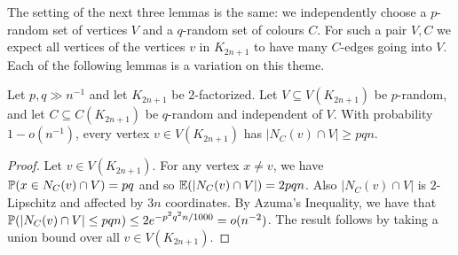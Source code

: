 



The setting of the next three lemmas is the same: we independently choose a $p$-random set of vertices $V$ and a $q$-random set of colours $C$. For such a pair $V,C$ we expect all vertices of the vertices $v$ in $K_{2n+1}$ to have many $C$-edges going into $V$. Each of the following lemmas is a variation on this theme.
\begin{lemma}\label{Lemma_high_degree_into_random_set}
Let $p, q\gg n^{-1}$ and let  $K_{2n+1}$ be $2$-factorized.
Let $V\subseteq V(K_{2n+1})$ be $p$-random, and let $C\subseteq C(K_{2n+1})$ be $q$-random and independent of $V$. With  probability $1-o(n^{-1})$, every vertex $v\in V(K_{2n+1})$ has $|N_C(v)\cap V|\geq pq n$.
\end{lemma}
\begin{proof} Let $v\in V(K_{2n+1})$.
For any vertex $x\neq v$, we have $\P(x\in N_C(v)\cap V)= pq$ and so $\E(|N_C(v)\cap V|)= 2pq n$.
Also $|N_C(v)\cap V|$ is $2$-Lipschitz and affected by $3n$ coordinates.
By Azuma's Inequality, we have that $\P(|N_C(v)\cap V|\leq pq n)\leq 2e^{-p^2q^{2}n/1000}= o(n^{-2})$. The result follows by taking a union bound over all $v\in V(K_{2n+1})$.
\end{proof}


